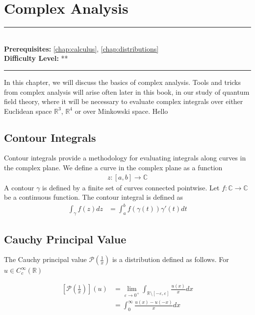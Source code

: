 \documentclass[book.tex]{subfiles}
\begin{document}
\chapter{Complex Analysis}
\label{chap:complex_analysis}
\noindent\rule{11cm}{0.4pt} \\
\textbf{Prerequisites:} \autoref{chap:calculus}, \autoref{chap:distributions} \\
\textbf{Difficulty Level:} ** \\
\noindent\rule{11cm}{0.4pt}
\vspace{5mm}

In this chapter, we will discuss the basics of complex analysis. Tools and tricks from complex analysis will arise often later in this book, in our study of quantum field theory, where it will be necessary to evaluate complex integrals over either Euclidean space $\mathbb{R}^3$, $\mathbb{R}^4$ or over Minkowski space. Hello


\section{Contour Integrals}

Contour integrals provide a methodology for evaluating integrals along curves in the complex plane. We define a curve in the complex plane as a function
\begin{align}
z: [a, b] \to \mathbb{C}
\end{align}
A contour $\gamma$ is defined by a finite set of curves connected pointwise. Let $f: \mathbb{C} \to \mathbb{C}$ be a continuous function. The contour integral is defined as
\begin{align}
\int_\gamma f(z) dz &= \int_a^b f(\gamma(t)) \gamma'(t) dt
\end{align}


\section{Cauchy Principal Value}

The Cauchy principal value $\mathcal{P}(\frac{1}{x})$ is a distribution defined as follows. For $u \in C^{\infty}_c(\mathbb{R})$

\begin{align}
    \left [ \mathcal{P} \left ( \frac{1}{x} \right )\right ](u) &= \lim_{\varepsilon \to 0^+} \int_{\mathbb{R} \setminus [-\varepsilon, \varepsilon]} \frac{u(x)}{x} dx  \\
    &= \int_0^{\infty} \frac{u(x) - u(-x)}{x} dx 
\end{align}
\end{document}
